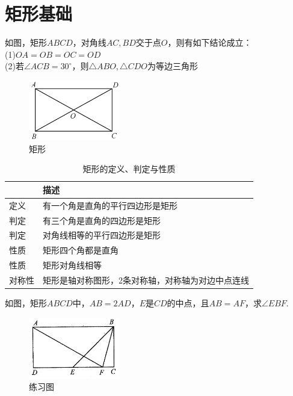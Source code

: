 \documentclass{ecnuthesis}
\begin{document}
\section{矩形基础}
\begin{knowledge}
    如图，矩形$ABCD$，对角线$AC,BD$交于点$O$，则有如下结论成立：\\
    (1)$OA=OB=OC=OD$ \\
    (2)若$\angle ACB=30^\circ$，则$\triangle ABO,\triangle CDO$为等边三角形 \\
\end{knowledge}
\begin{figure}[H]
\centering
\includegraphics[width=4cm]{picture/653.png}
\caption{矩形}
\end{figure}
\begin{table}[H]
\centering
\caption{矩形的定义、判定与性质}
\begin{tabular}{|l|l|}
\hline
    & 描述 \\
\hline
定义 & 有一个角是直角的平行四边形是矩形 \\
\hline
判定 & 有三个角是直角的四边形是矩形 \\
\hline
判定 & 对角线相等的平行四边形是矩形 \\
\hline
性质 & 矩形四个角都是直角 \\
\hline
性质 & 矩形对角线相等 \\
\hline
对称性 & 矩形是轴对称图形，2条对称轴，对称轴为对边中点连线 \\
\hline
\end{tabular}
\end{table}
\begin{problem}
    如图，矩形$ABCD$中，$AB=2AD$，$E$是$CD$的中点，且$AB=AF$，求$\angle EBF$.
\end{problem}
\begin{figure}[H]
\centering
\includegraphics[width=4cm]{picture/688.png}
\caption{练习图}
\end{figure}
\end{document}
